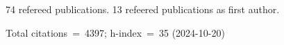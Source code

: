74 refereed publications. 13 refeered publications as first author.

Total citations~=~4397; h-index~=~35 (2024-10-20)
